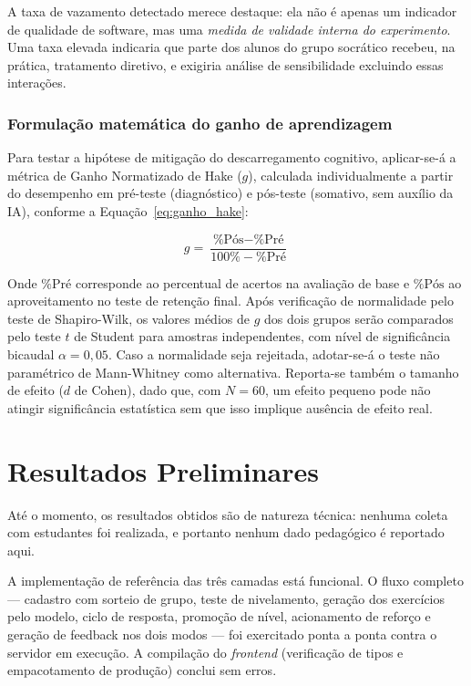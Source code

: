 \documentclass[10pt, a4paper, twocolumn]{article}
\begin{document}
A taxa de vazamento detectado merece destaque: ela não é apenas um indicador de
qualidade de software, mas uma \textit{medida de validade interna do
experimento}. Uma taxa elevada indicaria que parte dos alunos do grupo socrático
recebeu, na prática, tratamento diretivo, e exigiria análise de sensibilidade
excluindo essas interações.

\subsubsection{Formulação matemática do ganho de aprendizagem}

Para testar a hipótese de mitigação do descarregamento cognitivo, aplicar-se-á a
métrica de Ganho Normatizado de Hake ($g$), calculada individualmente a partir do
desempenho em pré-teste (diagnóstico) e pós-teste (somativo, sem auxílio da IA),
conforme a Equação~\ref{eq:ganho_hake}:

\begin{equation}
    g = \frac{\text{\% Pós} - \text{\% Pré}}{100\% - \text{\% Pré}}
    \label{eq:ganho_hake}
\end{equation}

Onde $\text{\% Pré}$ corresponde ao percentual de acertos na avaliação de base e
$\text{\% Pós}$ ao aproveitamento no teste de retenção final. Após verificação de
normalidade pelo teste de Shapiro-Wilk, os valores médios de $g$ dos dois grupos
serão comparados pelo teste $t$ de Student para amostras independentes, com nível
de significância bicaudal $\alpha = 0{,}05$. Caso a normalidade seja rejeitada,
adotar-se-á o teste não paramétrico de Mann-Whitney como alternativa. Reporta-se
também o tamanho de efeito ($d$ de Cohen), dado que, com $N = 60$, um efeito
pequeno pode não atingir significância estatística sem que isso implique
ausência de efeito real.

\section{Resultados Preliminares}
\label{sec:resultados}

Até o momento, os resultados obtidos são de natureza técnica: nenhuma coleta com
estudantes foi realizada, e portanto nenhum dado pedagógico é reportado aqui.

A implementação de referência das três camadas está funcional. O fluxo completo
--- cadastro com sorteio de grupo, teste de nivelamento, geração dos exercícios
pelo modelo, ciclo de resposta, promoção de nível, acionamento de reforço e
geração de feedback nos dois modos --- foi exercitado ponta a ponta contra o
servidor em execução. A compilação do
\textit{frontend} (verificação de tipos e empacotamento de produção) conclui sem
erros.
\end{document}
